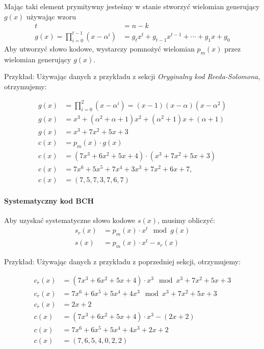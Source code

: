 Mając taki element prymitywny jesteśmy w stanie stworzyć wielomian generujący $g(x)$ używając wzoru
\begin{align*}
    t &= n - k \\
    g(x) = \prod_{i=0}^{t-1} (x - \alpha^i) &= g_{t}x^t + g_{t-1}x^{t-1} +
    \cdots + g_{1}x + g_{0}
\end{align*}
Aby utworzyć słowo kodowe, wystarczy pomnożyć wielomian $p_m(x)$ przez wielomian generujący $g(x)$.
\newline
\newline
\begin{minipage}{\textwidth}
Przykład:
\newline
Używając danych z przykładu z sekcji \textit{Oryginalny kod Reeda-Solomona}, otrzymujemy:
\end{minipage}
\begin{align*}
    g(x) &= \prod_{i=0}^{2} (x - \alpha^i) = (x - 1)(x - \alpha)(x - \alpha^2) \\
    g(x) &= x^3 + (\alpha^2 + \alpha + 1)x^2 + (\alpha^2 + 1)x + (\alpha + 1) \\
    g(x) &= x^3 + 7x^2 + 5x + 3 \\
    c(x) &= p_m(x) \cdot g(x) \\
    c(x) &= (7x^3 + 6x^2 + 5x + 4) \cdot (x^3 + 7x^2 + 5x + 3) \\
    c(x) &= 7x^6 + 5x^5 + 7x^4 + 3x^3 + 7x^2 + 6x + 7, \\
    c(x) &= (7,5,7,3,7,6,7)
\end{align*}

\paragraph{Systematyczny kod BCH}

Aby uzyskać systematyczne słowo kodowe $s(x)$, musimy obliczyć:
\begin{align*}
    s_r(x) &= p_m(x) \cdot x^t \mod g(x) \\
    s(x) &= p_m(x) \cdot x^t - s_r(x)
\end{align*}
\begin{minipage}{\textwidth}
Przykład:
\newline
Używając danych z przykładu z poprzedniej sekcji, otrzymujemy:
\end{minipage}
\begin{align*}
    c_r(x) &= (7x^3 + 6x^2 + 5x + 4) \cdot x^3 \mod x^3 + 7x^2 + 5x + 3 \\
    c_r(x) &= 7x^6 + 6x^5 + 5x^4 + 4x^3 \mod x^3 + 7x^2 + 5x + 3 \\
    c_r(x) &= 2x + 2 \\
    c(x) &= (7x^3 + 6x^2 + 5x + 4) \cdot x^3 - (2x + 2) \\
    c(x) &= 7x^6 + 6x^5 + 5x^4 + 4x^3 + 2x + 2 \\
    c(x) &= (7,6,5,4,0,2,2)
\end{align*}

